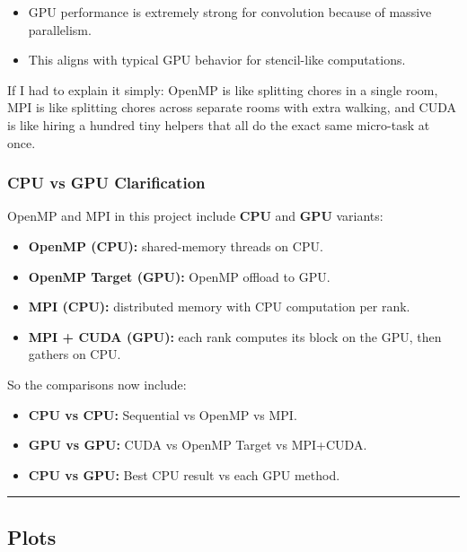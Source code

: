 \documentclass[
]{article}
\providecommand{\tightlist}{%
  \setlength{\itemsep}{0pt}\setlength{\parskip}{0pt}}
\begin{document}
\begin{itemize}
\tightlist
\item
  GPU performance is extremely strong for convolution because of massive
  parallelism.
\item
  This aligns with typical GPU behavior for stencil-like computations.
\end{itemize}

If I had to explain it simply: OpenMP is like splitting chores in a
single room, MPI is like splitting chores across separate rooms with
extra walking, and CUDA is like hiring a hundred tiny helpers that all
do the exact same micro-task at once.

\subsubsection{CPU vs GPU Clarification}\label{cpu-vs-gpu-clarification}

OpenMP and MPI in this project include \textbf{CPU} and \textbf{GPU}
variants:

\begin{itemize}
\tightlist
\item
  \textbf{OpenMP (CPU):} shared-memory threads on CPU.
\item
  \textbf{OpenMP Target (GPU):} OpenMP offload to GPU.
\item
  \textbf{MPI (CPU):} distributed memory with CPU computation per rank.
\item
  \textbf{MPI + CUDA (GPU):} each rank computes its block on the GPU,
  then gathers on CPU.
\end{itemize}

So the comparisons now include:

\begin{itemize}
\tightlist
\item
  \textbf{CPU vs CPU:} Sequential vs OpenMP vs MPI.
\item
  \textbf{GPU vs GPU:} CUDA vs OpenMP Target vs MPI+CUDA.
\item
  \textbf{CPU vs GPU:} Best CPU result vs each GPU method.
\end{itemize}

\begin{center}\rule{0.5\linewidth}{0.5pt}\end{center}

\subsection{Plots}\label{plots}
\end{document}
